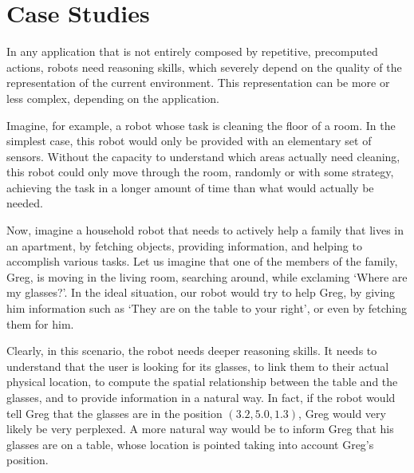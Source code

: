 \part{Case Studies} %

\label{part:case_studies} %



In any application that is not entirely composed by repetitive, precomputed actions, robots need reasoning skills, which severely depend on the quality of the representation of the current environment. This representation can be more or less complex, depending on the application. 

Imagine, for example, a robot whose task is cleaning the floor of a room. In the simplest case, this robot would only be provided with an elementary set of sensors. Without the capacity to understand which areas actually need cleaning, this robot could only move through the room, randomly or with some strategy, achieving the task in a longer amount of time than what would actually be needed. 


Now, imagine a household robot that needs to actively help a family that lives in an apartment, by fetching objects, providing information, and helping to accomplish various tasks. Let us imagine that one of the members of the family, Greg, is moving in the living room, searching around, while exclaming `Where are my glasses?'. In the ideal situation, our robot would try to help Greg, by giving him information such as `They are on the table to your right', or even by fetching them for him. 

Clearly, in this scenario, the robot needs deeper reasoning skills. It needs to understand that the user is looking for its glasses, to link them to their actual physical location, to compute the spatial relationship between the table and the glasses, and to provide information in a natural way. In fact, if the robot would tell Greg that the glasses are in the position $(3.2, 5.0 , 1.3)$, Greg would very likely be very perplexed. A more natural way would be to inform Greg that his glasses are on a table, whose location is pointed taking into account Greg's position.

